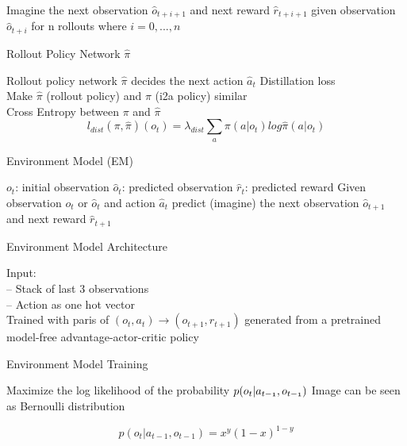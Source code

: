 Imagine the next observation $\hat{o}_{t+i+1}$ and next reward $\hat{r}_{t+i+1}$ given observation $\hat{o}_{t+i}$ for n rollouts where $i = 0, ..., n$ 
 
 
Rollout Policy Network $\hat{\pi}$ 
 
Rollout policy network $\hat{\pi}$ decides the next action $\hat{a}_t$ 
Distillation loss\\ 
Make $\hat{\pi}$ (rollout policy) and $\pi$ (i2a policy) similar\\ 
   
 
Cross Entropy between $\pi$ and $\hat{\pi}$\\ 
  \begin{equation} 
    l_{dist}(\pi, \hat{\pi})(o_t) = \lambda_{dist} \sum_a \pi(a | o_t) log \hat{\pi}(a|o_t) 
  \end{equation} 
     
 
 
Environment Model (EM) 
 
$o_t$: initial observation 
 $\hat{o}_t$: predicted observation 
 $\hat{r}_t$: predicted reward 
Given observation $o_t$ or $\hat{o}_t$ and action $\hat{a}_t$ predict (imagine) the next observation $\hat{o}_{t+1}$ and next reward $\hat{r}_{t+1}$  
   
 
 
Environment Model Architecture 
 
 Input:\\ 
    -- Stack of last 3 observations\\ 
    -- Action as one hot vector\\ 
Trained with paris of $(o_t, a_t) \rightarrow (o_{t+1}, r_{t+1})$ generated from a pretrained model-free advantage-actor-critic policy 
   
 
 
    Environment Model Training 
 
Maximize the log likelihood of the probability $\mathnormal{p(o_t | a_{t-1}, o_{t-1})}$ 
Image can be seen as Bernoulli distribution 
 
  \begin{equation} 
   p(o_t | a_{t-1}, o_{t-1}) = x^y (1-x)^{1-y} 
  \end{equation} 
   
